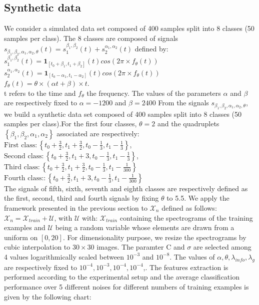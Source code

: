 \documentclass{article}
\def\tX{\boldsymbol{{\mathscr X}}}
\begin{document}
\subsection{Synthetic data}
We consider a simulated data set composed of 400 samples split into 8 classes (50 samples per class). The 8 classes are composed of signals $s_{\beta_{1},\beta_{2},\alpha_{1},\alpha_{2},\theta}(t)=s^{\beta_{1},\beta_{2}}_{1}(t)+s^{\alpha_{1},\alpha_{2}}_{2}(t)$ defined by:
\\
$s^{\beta_{1},\beta_{2}}_{1}(t)=\mathbf{1}_{[t_{0}+\beta_{1},t_{1}+\beta_{2}]}(t)cos(2\pi\times f_{\theta}(t))$
\\
$s^{\alpha_{1},\alpha_{2}}_{2}(t)=\mathbf{1}_{[t_{0}-\alpha_{1},t_{1}-\alpha_{2}]}(t)cos(2\pi\times f_{\theta}(t))$
\\
$f_{\theta}(t)=\theta\times(\alpha t+\beta)\times t$.\\
t refers to the time and $f_{\theta}$ the frequency. The values of the parameters $\alpha$ and $\beta$ are respectively fixed to  $\alpha=-1200$ and $\beta=2400$
From the signals $s_{\beta_{1},\beta_{2},\alpha_{1},\alpha_{2},\theta}$, we build a synthetic data set composed of 400 samples split into 8 classes (50 samples per class).For the first four classes, $\theta=2$ and the quadruplets $\left\{\beta_{1},\beta_{2},\alpha_{1},\alpha_{2}\right\}$ associated are respectively:\\
$\text{First class}:\left\{t_{0}+\frac{3}{2},t_{1}+\frac{3}{2},t_{0}-\frac{1}{3},t_{1}-\frac{1}{3}\right\}$,\\
$\text{Second class}:\left\{t_{0}+\frac{3}{2},t_{1}+3,t_{0}-\frac{1}{3},t_{1}-\frac{1}{3}\right\}$,\\
$\text{Third class}:\left\{t_{0}+\frac{3}{2},t_{1}+\frac{3}{2},t_{0}-\frac{1}{3},t_{1}-\frac{1}{300}\right\}$\\
$\text{Fourth class:}:\left\{t_{0}+\frac{3}{2},t_{1}+3   ,t_{0}-\frac{1}{3},t_{1}-\frac{1}{300}\right\}$\\
The signals of fifth, sixth, seventh and eighth classes are respectively defined as the first, second, third and fourth signals by fixing $\theta$ to 5.5. We apply the framework presented in the previous section to $\tX_{n}$ defined as follows:\\
$\tX_{n}=\tX_{train}+\mathcal{U}$, with $\mathcal{U}$ with: $\tX_{train}$ containing the spectrograms of the training examples and $\mathcal{U}$ being a random variable whose elements are drawn from a uniform  on $[0,20]$. For dimensionality purpose, we resize the spectrograms by cubic interpolation to $30\times 30$ images. The paramter C and $\sigma$ are selected among 4 values logarithmically scaled between $10^{-3}$ and $10^{-8}$. The values of $\alpha,\theta,\lambda_{info},\lambda_{g}$ are respectively fixed to $10^{-4},10^{-3},10^{-4},10^{-4}$,. The features extraction is performed according to the experimental setup and the average classification performance over 5 different noises for different numbers of training examples is given by the following chart:
\end{document}
